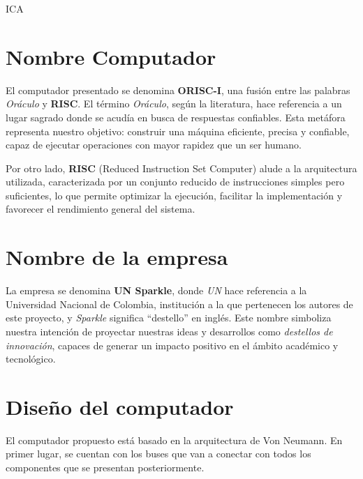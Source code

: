 ICA\documentclass{article}
\begin{document}


\section{Nombre Computador}

El computador presentado se denomina \textbf{ORISC-I}, una fusión entre las
palabras \textit{Oráculo} y \textbf{RISC}. El término \textit{Oráculo}, según
la literatura, hace referencia a un lugar sagrado donde se acudía en busca de
respuestas confiables. Esta metáfora representa nuestro objetivo: construir una
máquina eficiente, precisa y confiable, capaz de ejecutar operaciones con mayor
rapidez que un ser humano.

Por otro lado, \textbf{RISC} (Reduced Instruction Set Computer) alude a la
arquitectura utilizada, caracterizada por un conjunto reducido de instrucciones
simples pero suficientes, lo que permite optimizar la ejecución, facilitar la
implementación y favorecer el rendimiento general del sistema.

\section{Nombre de la empresa}

La empresa se denomina \textbf{UN Sparkle}, donde \textit{UN} hace referencia a
la Universidad Nacional de Colombia, institución a la que pertenecen los autores
de este proyecto, y \textit{Sparkle} significa “destello” en inglés. Este nombre
simboliza nuestra intención de proyectar nuestras ideas y desarrollos como
\textit{destellos de innovación}, capaces de generar un impacto positivo en
el ámbito académico y tecnológico.


\section{Diseño del computador}

El computador propuesto está basado en la arquitectura de Von Neumann.
En primer lugar, se cuentan con los buses que van a conectar con todos los componentes
que se presentan posteriormente.
\end{document}
